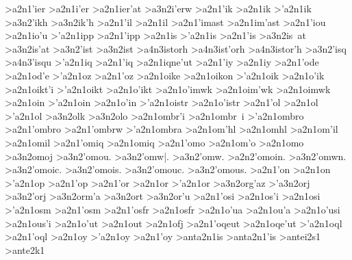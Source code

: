 {>a2n1'ier   		%
>a2n1i'er
>a2n1ier'at 		%
	>a3n2i'erw 		%
>a2n1'ik    		%
>a2n1ik
>'a2n1ik    		%
	>a3n2'ikh  		%
	>a3n2ik'h
>a2n1'il    		%
>a2n1il
>a2n1'imast 		%
>a2n1im'ast
>a2n1'iou   		%
>a2n1io'u
>'a2n1ipp   		%
>a2n1'ipp
>a2n1is     		%
>'a2n1is    		%
>a2n1'is
	>a3n2is~at  		%
	>a3n2is'at
	>a3n2'ist   		%
	>a3n2ist
		>a4n3istorh 		%
		>a4n3ist'orh 		%
		>a4n3istor'h
	>a3n2'isq   		%
		>a4n3'isqu 		%
>'a2n1iq     	   	%
>a2n1'iq	
>a2n1iqne'ut 		%
>a2n1'iy    		%
>a2n1iy
>a2n1'ode   		%
>a2n1od'e
>'a2n1oz    		%
>a2n1'oz
>a2n1oike		%
>a2n1oikon  		%
>'a2n1oik   		%
>a2n1o'ik
>a2n1oikt'i  		%
>'a2n1oikt  		%
>a2n1o'ikt
>a2n1o'imwk 		%
>a2n1oim'wk
>a2n1oimwk  		%
>a2n1oin    		%
>'a2n1oin   		%
>a2n1o'in
>'a2n1oistr 		%
>a2n1o'istr
>a2n1'ol    		%
>a2n1ol
>'a2n1ol    		%
	>a3n2olk  		%
	>a3n2olo  		%
>a2n1ombr'i 		%
>a2n1ombr~i
>'a2n1ombro		%
>a2n1'ombro
>a2n1'ombrw
>'a2n1ombra
>a2n1om'hl  		%
>a2n1omhl
>a2n1om'il 		%
>a2n1omil
>a2n1'omiq 		%
>a2n1omiq
>a2n1'omo		%
>a2n1om'o
>a2n1omo    		%
	>a3n2omoj 		%
	>a3n2'omou. 		%
	>a3n2'omw|.
	>a3n2'omw.
	>a2n2'omoin.
	>a3n2'omwn.
	>a3n2'omoic.
	>a3n2'omois.
	>a3n2'omouc.
	>a3n2'omous.
>a2n1'on 		%
>a2n1on
>'a2n1op  		%
>a2n1'op
>a2n1'or     		%
>a2n1or
>'a2n1or     		%
	>a3n2org'az 		%
	>'a3n2orj   		%
	>a3n2'orj
	>a3n2orm'a  		%
	>a3n2ort    		%
	>a3n2or'u   		%
>a2n1'osi 		%
>a2n1os'i
>a2n1osi  		%
>'a2n1osm 		%
>a2n1'osm
>a2n1'osfr 		%
>a2n1osfr
>a2n1o'ua  		%
>a2n1ou'a
>a2n1o'usi 		%
>a2n1ous'i
>a2n1o'ut  		%
>a2n1out
>a2n1ofj   		%
>a2n1'oqeut 		%
>a2n1oqe'ut
>'a2n1oql  		%
>a2n1'oql
>a2n1oy    		%
>'a2n1oy   		%
>a2n1'oy
>anta2n1is  		%
>anta2n1'is 		%
>antei2s1   		%
>ante2k1    		%
}
